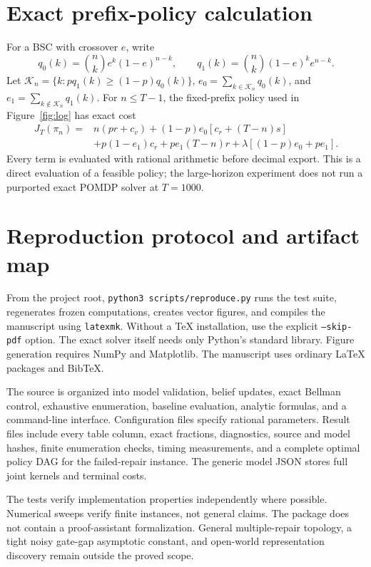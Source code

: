\section{Exact prefix-policy calculation}
For a BSC with crossover $e$, write
\[
q_0(k)=\binom nk e^k(1-e)^{n-k},\qquad
q_1(k)=\binom nk (1-e)^k e^{n-k}.
\]
Let $\mathcal K_n=\{k:pq_1(k)\ge(1-p)q_0(k)\}$,
$e_0=\sum_{k\in\mathcal K_n}q_0(k)$, and
$e_1=\sum_{k\notin\mathcal K_n}q_1(k)$.
For $n\le T-1$, the fixed-prefix policy used in
Figure~\ref{fig:log} has exact cost
\begin{align*}
J_T(\pi_n)={}&n(pr+c_v)
 +(1-p)e_0[c_r+(T-n)s]\\
 &+p(1-e_1)c_r+pe_1(T-n)r
 +\lambda[(1-p)e_0+pe_1].
\end{align*}
Every term is evaluated with rational arithmetic before decimal export.
This is a direct evaluation of a feasible policy; the large-horizon experiment
does not run a purported exact POMDP solver at $T=1000$.

\section{Reproduction protocol and artifact map}
From the project root, \texttt{python3 scripts/reproduce.py} runs the test suite,
regenerates frozen computations, creates vector figures, and compiles the
manuscript using \texttt{latexmk}. Without a TeX installation, use the explicit
\texttt{--skip-pdf} option. The exact solver itself needs only
Python's standard library. Figure generation requires NumPy and Matplotlib.
The manuscript uses ordinary LaTeX packages and BibTeX.

The source is organized into model validation, belief updates, exact Bellman
control, exhaustive enumeration, baseline evaluation, analytic formulas, and a
command-line interface. Configuration files specify rational parameters.
Result files include every table column, exact fractions, diagnostics, source
and model hashes, finite enumeration checks, timing measurements, and a complete
optimal policy DAG for the failed-repair instance. The generic model JSON stores
full joint kernels and terminal costs.

The tests verify implementation properties independently where possible.
Numerical sweeps verify finite instances, not general claims. The package does
not contain a proof-assistant formalization. General multiple-repair topology,
a tight noisy gate-gap asymptotic constant, and open-world representation
discovery remain outside the proved scope.

